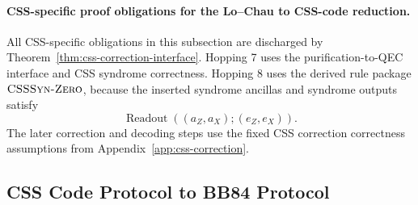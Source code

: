 \documentclass[acmsmall,screen,review,anonymous,nonacm]{acmart}
\theoremstyle{defn_style}
\newcommand{\asteq}{\mathrel{*}=}
\begin{document}

\paragraph{CSS-specific proof obligations for the Lo--Chau to CSS-code reduction.}

All CSS-specific obligations in this subsection are discharged by
Theorem~\ref{thm:css-correction-interface}. Hopping 7 uses the
purification-to-QEC interface and CSS syndrome correctness. Hopping 8 uses the
derived rule package \(\textsc{CSSSyn-Zero}\), because the inserted syndrome
ancillas and syndrome outputs satisfy
\[
\operatorname{Readout}((a_Z,a_X);(e_Z,e_X)).
\]
The later correction and decoding steps use the fixed CSS correction
correctness assumptions from Appendix~\ref{app:css-correction}.

\newpage
\subsection{CSS Code Protocol to BB84 Protocol}
\end{document}
